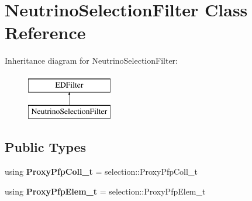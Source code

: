 \hypertarget{classNeutrinoSelectionFilter}{\section{Neutrino\-Selection\-Filter Class Reference}
\label{classNeutrinoSelectionFilter}
}
Inheritance diagram for Neutrino\-Selection\-Filter\-:\begin{figure}[H]
\begin{center}
\leavevmode
\includegraphics[height=2.000000cm]{classNeutrinoSelectionFilter}
\end{center}
\end{figure}
\subsection*{Public Types}
\begin{DoxyCompactItemize}
\item 
\hypertarget{classNeutrinoSelectionFilter_a7f4b9d53b7df6e6dec6227a60844f112}{using {\bfseries Proxy\-Pfp\-Coll\-\_\-t} = selection\-::\-Proxy\-Pfp\-Coll\-\_\-t}\label{classNeutrinoSelectionFilter_a7f4b9d53b7df6e6dec6227a60844f112}

\item 
\hypertarget{classNeutrinoSelectionFilter_a95a27c35e4604bf0a4feb59231d4e984}{using {\bfseries Proxy\-Pfp\-Elem\-\_\-t} = selection\-::\-Proxy\-Pfp\-Elem\-\_\-t}\label{classNeutrinoSelectionFilter_a95a27c35e4604bf0a4feb59231d4e984}

\end{DoxyCompactItemize}
